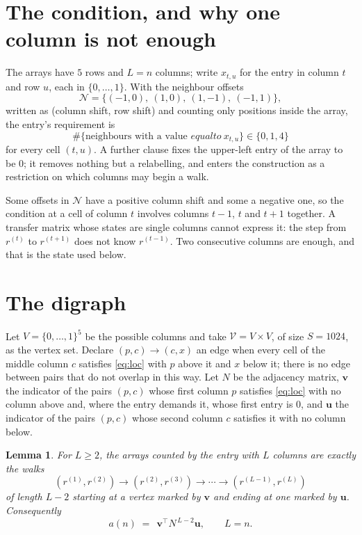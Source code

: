 \documentclass[11pt,a4paper]{article}
\theoremstyle{plain}
\newtheorem{lemma}[theorem]{Lemma}
\theoremstyle{definition}
\begin{document}
\section{The condition, and why one column is not enough}

The arrays have $5$ rows and $L=n$ columns; write $x_{t,u}$ for the entry in
column $t$ and row $u$, each in $\{0,\dots,1\}$. With the neighbour offsets
\[
\mathcal N=\{(-1,0),\ (1,0),\ (1,-1),\ (-1,1)\},
\]
written as (column shift, row shift) and counting only positions inside the array, the
entry's requirement is
\begin{equation}\label{eq:loc}
\#\{\text{neighbours with a value }equal to\ x_{t,u}\}\in\{0,1,4\}
\end{equation}
for every cell $(t,u)$. A further clause fixes the upper-left entry of the array to be $0$; it removes nothing but a relabelling, and enters the construction as a restriction on which columns may begin a walk.

Some offsets in $\mathcal N$ have a positive column shift and some a negative one, so the
condition at a cell of column $t$ involves columns $t-1$, $t$ and $t+1$ together. A transfer
matrix whose states are single columns cannot express it: the step from $r^{(t)}$ to
$r^{(t+1)}$ does not know $r^{(t-1)}$. Two consecutive columns are enough, and that is
the state used below.

\section{The digraph}

Let $V=\{0,\dots,1\}^{5}$ be the possible columns and take
$\mathcal V=V\times V$, of size $S=1024$, as the vertex set. Declare $(p,c)\to(c,x)$ an edge
when every cell of the middle column $c$ satisfies \eqref{eq:loc} with $p$ above it and $x$
below it; there is no edge between pairs that do not overlap in this way. Let $N$ be the
adjacency matrix, $\mathbf{v}$ the indicator of the pairs $(p,c)$ whose first column $p$
satisfies \eqref{eq:loc} with no column above and, where the entry demands it, whose first entry is $0$, and $\mathbf{u}$ the indicator of
the pairs $(p,c)$ whose second column $c$ satisfies it with no column below.

\begin{lemma}\label{lem:walk}
For $L\ge2$, the arrays counted by the entry with $L$ columns are exactly the walks
\[
(r^{(1)},r^{(2)})\to(r^{(2)},r^{(3)})\to\cdots\to(r^{(L-1)},r^{(L)})
\]
of length $L-2$ starting at a vertex marked by $\mathbf{v}$ and ending at one marked by
$\mathbf{u}$. Consequently
\[
a(n)\;=\;\,\mathbf{v}^{\!\top}N^{\,L-2}\mathbf{u},\qquad L=n .
\]
\end{lemma}
\end{document}
